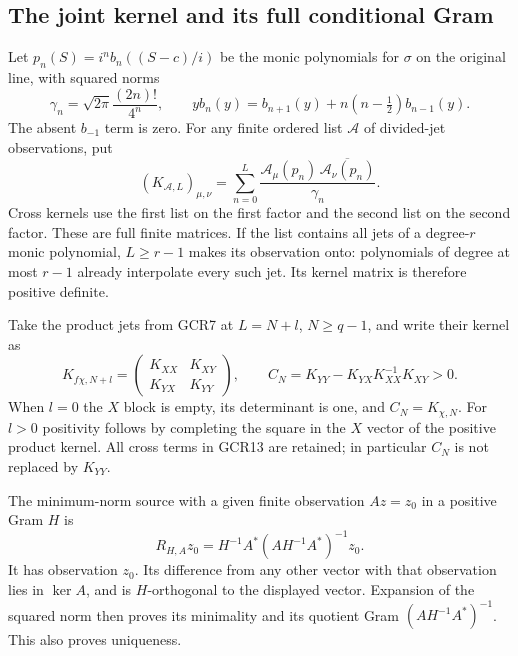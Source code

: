 \documentclass[11pt,a4paper]{article}
\begin{document}
\subsection{The joint kernel and its full conditional Gram}

Let $p_n(S)=i^n b_n((S-c)/i)$ be the monic polynomials for
$\sigma$ on the original line, with squared norms
\[
 \gamma_n=\sqrt{2\pi}\frac{(2n)!}{4^n},\qquad
 yb_n(y)=b_{n+1}(y)+n(n-\tfrac12)b_{n-1}(y).
\tag{GCR11}
\]
The absent $b_{-1}$ term is zero. For any finite ordered
list $\mathcal A$ of divided-jet observations, put
\[
 (K_{\mathcal A,L})_{\mu,\nu}
 =\sum_{n=0}^L
        \frac{\mathcal A_\mu(p_n)\,
                   \overline{\mathcal A_\nu(p_n)}}{\gamma_n}.
\tag{GCR12}
\]
Cross kernels use the first list on the first factor and the
second list on the second factor. These are full finite matrices.
If the list contains all jets of a degree-$r$ monic polynomial,
$L\geq r-1$ makes its observation onto: polynomials of degree
at most $r-1$ already interpolate every such jet. Its kernel
matrix is therefore positive definite.

Take the product jets from GCR7 at $L=N+l$, $N\geq q-1$,
and write their kernel as
\[
 K_{f\chi,N+l}
   =\begin{pmatrix}K_{XX}&K_{XY}\\K_{YX}&K_{YY}\end{pmatrix},
 \qquad
 C_N=K_{YY}-K_{YX}K_{XX}^{-1}K_{XY}>0.
\tag{GCR13}
\]
When $l=0$ the $X$ block is empty, its determinant is one,
and $C_N=K_{\chi,N}$. For $l>0$ positivity follows by completing
the square in the $X$ vector of the positive product kernel.
All cross terms in GCR13 are retained; in particular $C_N$
is not replaced by $K_{YY}$.

The minimum-norm source with a given finite observation $Az=z_0$
in a positive Gram $H$ is
\[
 R_{H,A}z_0=H^{-1}A^*(AH^{-1}A^*)^{-1}z_0.
\tag{GCR14}
\]
It has observation $z_0$. Its difference from any other vector
with that observation lies in $\ker A$, and is $H$-orthogonal
to the displayed vector. Expansion of the squared norm then
proves its minimality and its quotient Gram
$(AH^{-1}A^*)^{-1}$. This also proves uniqueness.
\end{document}
